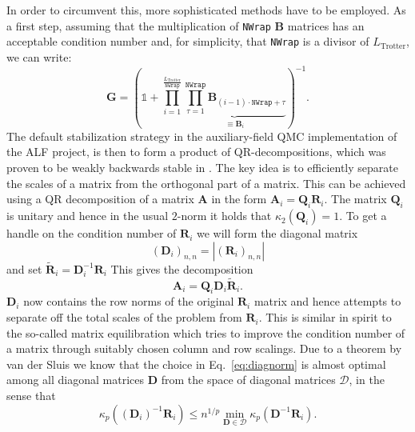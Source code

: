 In order to circumvent this, more sophisticated methods have to be employed. As a first step, assuming that the multiplication of \texttt{NWrap} $\bm{B}$ matrices has an acceptable condition number and, for simplicity, that \texttt{NWrap} is a divisor of $L_{\text{Trotter}}$, we can write:
\begin{equation}
\bm{G} = \left( \mathds{1} + \prod\limits_{ i = 1}^{\frac{L_{\text{Trotter}}} {\texttt{NWrap}}}       \underbrace{\prod_{\tau=1}^{\texttt{NWrap}} \bm{B}_{(i-1)  \cdot  \texttt{NWrap}+ \tau} }_{ \equiv \mathcal{\bm{B}}_i}\right)^{-1}.
\end{equation}
The default stabilization strategy in the auxiliary-field QMC implementation of the ALF project, is then to form a product of QR-decompositions, which was proven to be weakly backwards stable in \cite{Bai2011}.
The key idea is to efficiently separate the scales of a matrix from the orthogonal part of a matrix.
This can be achieved using a QR decomposition of a matrix $\bm{A}$ in the form $\bm{A}_i = \bm{Q}_i \bm{R}_i$. The matrix $\bm{Q}_i$ is unitary and hence in the usual $2$-norm it holds that $\kappa_2(\bm{Q}_i) = 1$.
To get a handle on the condition number of $\bm{R}_i$ we will form the
diagonal matrix
\begin{equation}
(\bm{D}_i)_{n,n} = |(\bm{R}_i)_{n,n}|
\label{eq:diagnorm}
\end{equation}
and set $\tilde{\bm{R}}_i = \bm{D}_i^{-1} \bm{R}_i$
This gives the decomposition
\begin{equation}
\bm{A}_i = \bm{Q}_i \bm{D}_i \tilde{\bm{R}}_i.
\end{equation}
$\bm{D}_i$ now contains the row norms of the original $\bm{R}_i$ matrix and hence attempts to separate off the total scales of the problem from $\bm{R}_i$.
This is similar in spirit to the so-called matrix equilibration which tries to improve the condition number of a matrix through suitably chosen column and row scalings.
Due to a theorem by van der Sluis \cite{vanderSluis1969} we know that the choice in Eq.~\eqref{eq:diagnorm} is almost optimal among all diagonal matrices $\bm{D}$ from the space of diagonal matrices $\mathcal{D}$, in the sense that
\begin{equation*}
\kappa_p((\bm{D}_i)^{-1} \bm{R}_i ) \leq n^{1/p} \min_{\bm{D} \in \mathcal{D}} \kappa_p(\bm{D}^{-1} \bm{R}_i).
\end{equation*}
